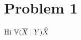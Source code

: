 \documentclass[12pt]{article}
\begin{document}
\section*{Problem 1}
Hi $\mathbb{V} (\overline{X} \mid Y) \widehat{X}$
\end{document}
